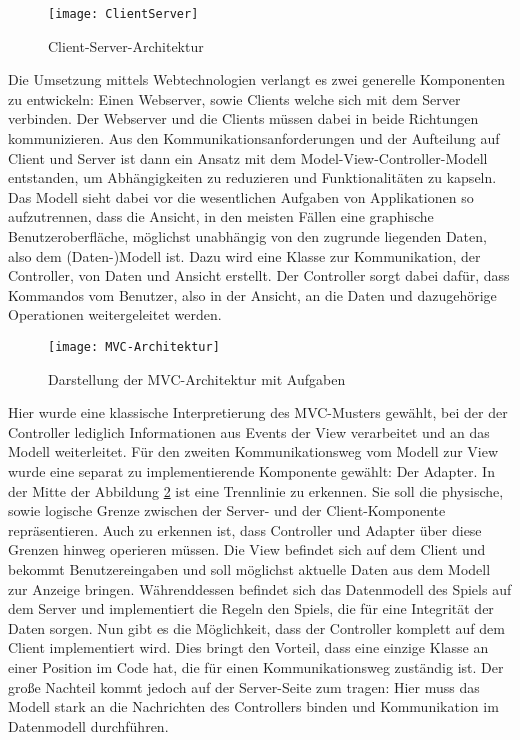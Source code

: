 \begin{figure}[htp]
	\centering
	\captionsetup{justification=centering}
	\texttt{[image: ClientServer]}
	\caption[Client-Server-Architektur]{Client-Server-Architektur}
	\label{fig:Client-Server-Architektur}
\end{figure}
Die Umsetzung mittels Webtechnologien verlangt es zwei generelle Komponenten zu entwickeln: Einen Webserver, sowie Clients welche sich mit dem Server verbinden.
Der Webserver und die Clients müssen dabei in beide Richtungen kommunizieren.
Aus den Kommunikationsanforderungen und der Aufteilung auf Client und Server ist dann ein Ansatz mit dem Model-View-Controller-Modell entstanden, um Abhängigkeiten zu reduzieren und Funktionalitäten zu kapseln. Das Modell sieht dabei vor die wesentlichen Aufgaben von Applikationen so aufzutrennen, dass die Ansicht, in den meisten Fällen eine graphische Benutzeroberfläche, möglichst unabhängig von den zugrunde liegenden Daten, also dem (Daten-)Modell ist. Dazu wird eine Klasse zur Kommunikation, der Controller, von Daten und Ansicht erstellt. Der Controller sorgt dabei dafür, dass Kommandos vom Benutzer, also in der Ansicht, an die Daten und dazugehörige Operationen weitergeleitet werden.
\begin{figure}[h]
	\centering
	\captionsetup{justification=centering}
	\texttt{[image: MVC-Architektur]}
	\caption[MVC]{Darstellung der MVC-Architektur mit Aufgaben}
	\label{fig:MVC}
\end{figure}
Hier wurde eine klassische Interpretierung des MVC-Musters gewählt, bei der der Controller lediglich Informationen aus Events der View verarbeitet und an das Modell weiterleitet. Für den zweiten Kommunikationsweg vom Modell zur View wurde eine separat zu implementierende Komponente gewählt: Der Adapter.
In der Mitte der Abbildung \ref{fig:MVC} ist eine Trennlinie zu erkennen. Sie soll die physische, sowie logische Grenze zwischen der Server- und der Client-Komponente repräsentieren. Auch zu erkennen ist, dass Controller und Adapter über diese Grenzen hinweg operieren müssen. Die View befindet sich auf dem Client und bekommt Benutzereingaben und soll möglichst aktuelle Daten aus dem Modell zur Anzeige bringen. Währenddessen befindet sich das Datenmodell des Spiels auf dem Server und implementiert die Regeln den Spiels, die für eine Integrität der Daten sorgen. Nun gibt es die Möglichkeit, dass der Controller komplett auf dem Client implementiert wird. Dies bringt den Vorteil, dass eine einzige Klasse an einer Position im Code hat, die für einen Kommunikationsweg zuständig ist. Der große Nachteil kommt jedoch auf der Server-Seite zum tragen: Hier muss das Modell stark an die Nachrichten des Controllers binden und Kommunikation im Datenmodell durchführen.  
